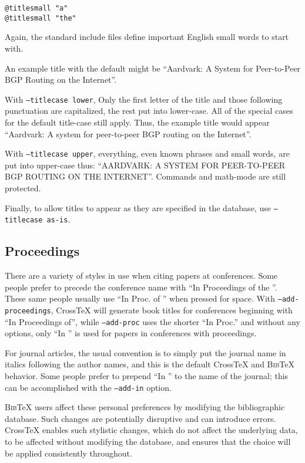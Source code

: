 \documentclass{article}
\newcommand{\XTX}{Cross\TeX}
\newcommand{\BibTeX}{\textsc{Bib}\TeX}
\begin{document}
\begin{small}\begin{verbatim}
@titlesmall "a"
@titlesmall "the"
\end{verbatim}\end{small}

Again, the standard include files define important English small words
to start with.

An example title with the default might be ``Aardvark: A System for
Peer-to-Peer BGP Routing on the Internet''.

With \texttt{--titlecase lower}, Only the first letter of the title and
those following punctuation are capitalized, the rest put into lower-case.
All of the special cases for the default title-case still apply.  Thus,
the example title would appear ``Aardvark: A system for peer-to-peer
BGP routing on the Internet''.

With \texttt{--titlecase upper}, everything, even known phrases and
small words, are put into upper-case thus: ``AARDVARK: A SYSTEM FOR
PEER-TO-PEER BGP ROUTING ON THE INTERNET''.  Commands and math-mode are
still protected.

Finally, to allow titles to appear as they are specified in the database,
use \texttt{--titlecase as-is}.

\subsection{Proceedings}

There are a variety of styles in use when citing papers at
conferences. Some people prefer to precede the conference name with
``In Proceedings of the ''.  These same people usually use ``In Proc. of
'' when pressed for space.  With \texttt{--add-proceedings}, \XTX{} will
generate book titles for conferences beginning with ``In Proceedings of'',
while \texttt{--add-proc} uses the shorter ``In Proc.'' and without any
options, only ``In '' is used for papers in conferences with proceedings.

For journal articles, the usual convention is to simply put the journal
name in italics following the author names, and this is the default \XTX{}
and \BibTeX{} behavior. Some people prefer to prepend ``In '' to the
name of the journal; this can be accomplished with the \texttt{--add-in}
option.

\BibTeX{} users affect these personal preferences by modifying the
bibliographic database. Such changes are potentially disruptive and can
introduce errors.  \XTX{} enables such stylistic changes, which do not
affect the underlying data, to be affected without modifying the database,
and ensures that the choice will be applied consistently throughout.
\end{document}
